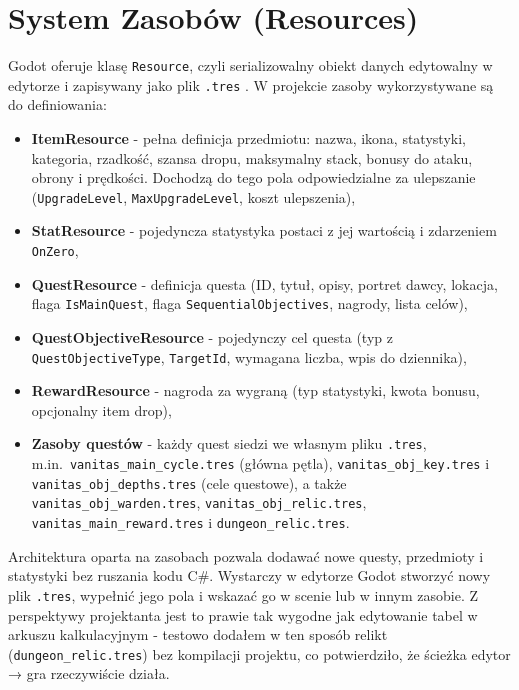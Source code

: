\section{System Zasobów (Resources)}

Godot oferuje klasę \texttt{Resource}, czyli serializowalny obiekt danych edytowalny w edytorze i zapisywany jako plik \texttt{.tres} \cite{godot4docs}. W projekcie zasoby wykorzystywane są do definiowania:

\begin{itemize}
    \item \textbf{ItemResource} - pełna definicja przedmiotu: nazwa, ikona, statystyki, kategoria, rzadkość, szansa dropu, maksymalny stack, bonusy do ataku, obrony i prędkości. Dochodzą do tego pola odpowiedzialne za ulepszanie (\texttt{UpgradeLevel}, \texttt{MaxUpgradeLevel}, koszt ulepszenia),
    \item \textbf{StatResource} - pojedyncza statystyka postaci z jej wartością i zdarzeniem \texttt{OnZero},
    \item \textbf{QuestResource} - definicja questa (ID, tytuł, opisy, portret dawcy, lokacja, flaga \texttt{IsMainQuest}, flaga \texttt{SequentialObjectives}, nagrody, lista celów),
    \item \textbf{QuestObjectiveResource} - pojedynczy cel questa (typ z \texttt{QuestObjectiveType}, \texttt{TargetId}, wymagana liczba, wpis do dziennika),
    \item \textbf{RewardResource} - nagroda za wygraną (typ statystyki, kwota bonusu, opcjonalny item drop),
    \item \textbf{Zasoby questów} - każdy quest siedzi we własnym pliku \texttt{.tres}, m.in.\ \texttt{vanitas\_main\_cycle.tres} (główna pętla), \texttt{vanitas\_obj\_key.tres} i \texttt{vanitas\_obj\_depths.tres} (cele questowe), a także \texttt{vanitas\_obj\_warden.tres}, \texttt{vanitas\_obj\_relic.tres}, \texttt{vanitas\_main\_reward.tres} i \texttt{dungeon\_relic.tres}.
\end{itemize}

Architektura oparta na zasobach pozwala dodawać nowe questy, przedmioty i statystyki bez ruszania kodu C\#. Wystarczy w edytorze Godot stworzyć nowy plik \texttt{.tres}, wypełnić jego pola i wskazać go w scenie lub w innym zasobie. Z perspektywy projektanta jest to prawie tak wygodne jak edytowanie tabel w arkuszu kalkulacyjnym - testowo dodałem w ten sposób relikt (\texttt{dungeon\_relic.tres}) bez kompilacji projektu, co potwierdziło, że ścieżka edytor → gra rzeczywiście działa.

